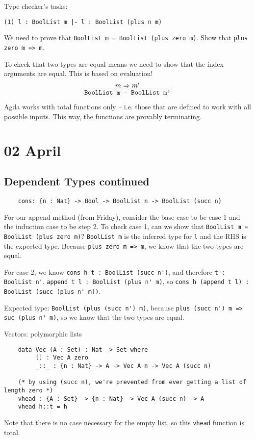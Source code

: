\documentclass[11pt]{article}
\begin{document}
Type checker's tasks:
\begin{verbatim}
(1) l : BoolList m |- l : BoolList (plus n m)
\end{verbatim}
We need to prove that \verb~BoolList m = BoolList (plus zero m)~. Show that \verb~plus zero m => m~.

To check that two types are equal means we need to show that the index arguments are equal. This is based on evaluation!
\[
    \infer{\verb~BoolList m = BoolList m'~}{ m \Rightarrow m^{\prime}}
\]

Agda works with total functions only -- i.e. those that are defined to work with all possible inputs. This way, the functions are provably terminating.

\section{02 April}
\subsection{Dependent Types continued}
\begin{verbatim}
    cons: {n : Nat} -> Bool -> BoolList n -> BoolList (succ n)
\end{verbatim}

For our append method (from Friday), consider the base case to be case 1 and the induction case to be step 2. To check case 1, can we show that \verb~BoolList m = BoolList (plus zero m)~? \verb~BoolList m~ is the inferred type for \verb~l~ and the RHS is the expected type. Because \verb~plus zero m => m~, we know that the two types are equal. 

For case 2, we know \verb~cons h t : BoolList (succ n')~, and therefore \verb~t : BoolList n'~. \verb~append t l : BoolList (plus n' m)~, so \verb~cons h (append t l) : BoolList (succ (plus n' m))~.

Expected type: \verb~BoolList (plus (succ n') m)~, because \verb~plus (succ n') m => suc (plus n' m)~, so we know that the two types are equal.

Vectors: polymorphic lists
\begin{verbatim}
    data Vec (A : Set) : Nat -> Set where
         [] : Vec A zero
         _::_ : {n : Nat} -> A -> Vec A n -> Vec A (succ n)

    (* by using (succ n), we're prevented from ever getting a list of length zero *)
    vhead : {A : Set} -> {n : Nat} -> Vec A (succ n) -> A
    vhead h::t = h
\end{verbatim}
Note that there is no case necessary for the empty list, so this \verb~vhead~ function is total.
\end{document}
